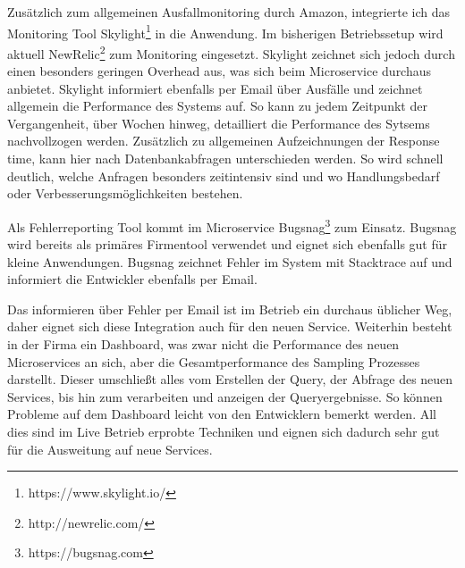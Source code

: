 Zusätzlich zum allgemeinen Ausfallmonitoring durch Amazon, integrierte ich das Monitoring Tool Skylight\footnote{https://www.skylight.io/} in die Anwendung. Im bisherigen Betriebssetup wird aktuell NewRelic\footnote{http://newrelic.com/} zum Monitoring eingesetzt. Skylight zeichnet sich jedoch durch einen besonders geringen Overhead aus, was sich beim Microservice durchaus anbietet. Skylight informiert ebenfalls per Email über Ausfälle und zeichnet allgemein die Performance des Systems auf. So kann zu jedem Zeitpunkt der Vergangenheit, über Wochen hinweg, detailliert die Performance des Sytsems nachvollzogen werden. Zusätzlich zu allgemeinen Aufzeichnungen der Response time, kann hier nach Datenbankabfragen unterschieden werden. So wird schnell deutlich, welche Anfragen besonders zeitintensiv sind und wo Handlungsbedarf oder Verbesserungsmöglichkeiten bestehen. 

Als Fehlerreporting Tool kommt im Microservice Bugsnag\footnote{https://bugsnag.com} zum Einsatz. Bugsnag wird bereits als primäres Firmentool verwendet und eignet sich ebenfalls gut für kleine Anwendungen. Bugsnag zeichnet Fehler im System mit Stacktrace auf und informiert die Entwickler ebenfalls per Email.

Das informieren über Fehler per Email ist im Betrieb ein durchaus üblicher Weg, daher eignet sich diese Integration auch für den neuen Service. Weiterhin besteht in der Firma ein Dashboard, was zwar nicht die Performance des neuen Microservices an sich, aber die Gesamtperformance des Sampling Prozesses darstellt. Dieser umschließt alles vom Erstellen der Query, der Abfrage des neuen Services, bis hin zum verarbeiten und anzeigen der Queryergebnisse. So können Probleme auf dem Dashboard leicht von den Entwicklern bemerkt werden. All dies sind im Live Betrieb erprobte Techniken und eignen sich dadurch sehr gut für die Ausweitung auf neue Services.